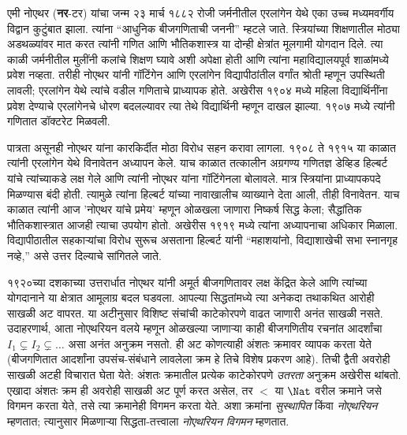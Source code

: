 \documentclass[../../../include/open-logic-section]{subfiles}
\begin{document}



एमी नोएथर (\textbf{नर}-टर) यांचा जन्म २३ मार्च १८८२ रोजी जर्मनीतील एरलांगेन येथे एका उच्च मध्यमवर्गीय विद्वान कुटुंबात झाला. त्यांना “आधुनिक बीजगणिताची जननी” म्हटले जाते. स्त्रियांच्या शिक्षणातील मोठ्या अडथळ्यांवर मात करत त्यांनी गणित आणि भौतिकशास्त्र या दोन्ही क्षेत्रांत मूलगामी योगदान दिले. त्या काळी जर्मनीतील मुलींनी कलांचे शिक्षण घ्यावे अशी अपेक्षा होती आणि त्यांना महाविद्यालयपूर्व शाळांमध्ये प्रवेश नव्हता. तरीही नोएथर यांनी गॉटिंगेन आणि एरलांगेन विद्यापीठांतील वर्गांत श्रोती म्हणून उपस्थिती लावली; एरलांगेन येथे त्यांचे वडील गणिताचे प्राध्यापक होते. अखेरीस १९०४ मध्ये महिला विद्यार्थिनींना प्रवेश देण्याचे एरलांगेनचे धोरण बदलल्यावर त्या तेथे विद्यार्थिनी म्हणून दाखल झाल्या. १९०७ मध्ये त्यांनी गणितात डॉक्टरेट मिळवली.

पात्रता असूनही नोएथर यांना कारकिर्दीत मोठा विरोध सहन करावा लागला. १९०८ ते १९१५ या काळात त्यांनी एरलांगेन येथे विनावेतन अध्यापन केले. याच काळात तत्कालीन अग्रगण्य गणितज्ञ डेव्हिड हिल्बर्ट यांचे त्यांच्याकडे लक्ष गेले आणि त्यांनी नोएथर यांना गॉटिंगेनला बोलावले. मात्र स्त्रियांना प्राध्यापकपदे मिळण्यास बंदी होती. त्यामुळे त्यांना हिल्बर्ट यांच्या नावाखालीच व्याख्याने देता आली, तीही विनावेतन. याच काळात त्यांनी आज 'नोएथर यांचे प्रमेय' म्हणून ओळखला जाणारा निष्कर्ष सिद्ध केला; सैद्धांतिक भौतिकशास्त्रात आजही त्याचा उपयोग होतो. अखेरीस १९१९ मध्ये त्यांना अध्यापनाचा अधिकार मिळाला. विद्यापीठातील सहकाऱ्यांचा विरोध सुरूच असताना हिल्बर्ट यांनी “महाशयांनो, विद्याशाखेची सभा स्नानगृह नव्हे,” असे उत्तर दिल्याचे सांगितले जाते.

१९२०च्या दशकाच्या उत्तरार्धात नोएथर यांनी अमूर्त बीजगणितावर लक्ष केंद्रित केले आणि त्यांच्या योगदानाने या क्षेत्रात आमूलाग्र बदल घडवला. आपल्या सिद्धतांमध्ये त्या अनेकदा तथाकथित आरोही साखळी अट वापरत. या अटीनुसार विशिष्ट संचांची काटेकोरपणे वाढत जाणारी अनंत साखळी नसते. उदाहरणार्थ, आता नोएथरियन वलये म्हणून ओळखल्या जाणाऱ्या काही बीजगणितीय रचनांत आदर्शांचा $I_1
\subsetneq I_2 \subsetneq \dots$ असा अनंत अनुक्रम नसतो. ही अट कोणत्याही अंशतः क्रमावर व्यापक करता येते (बीजगणितात आदर्शांना उपसंच-संबंधाने लावलेला क्रम हे तिचे विशेष प्रकरण आहे). तिची द्वैती अवरोही साखळी अटही विचारात घेता येते: अंशतः क्रमातील प्रत्येक काटेकोरपणे \emph{उतरता} अनुक्रम अखेरीस थांबतो. एखादा अंशतः क्रम ही अवरोही साखळी अट पूर्ण करत असेल, तर $<$ या $\Nat$ वरील क्रमाने जसे विगमन करता येते, तसे त्या क्रमानेही विगमन करता येते. अशा क्रमांना \emph{सुस्थापित} किंवा \emph{नोएथरियन} म्हणतात; त्यानुसार मिळणाऱ्या सिद्धता-तत्त्वाला \emph{नोएथरियन विगमन} म्हणतात.
\end{document}
